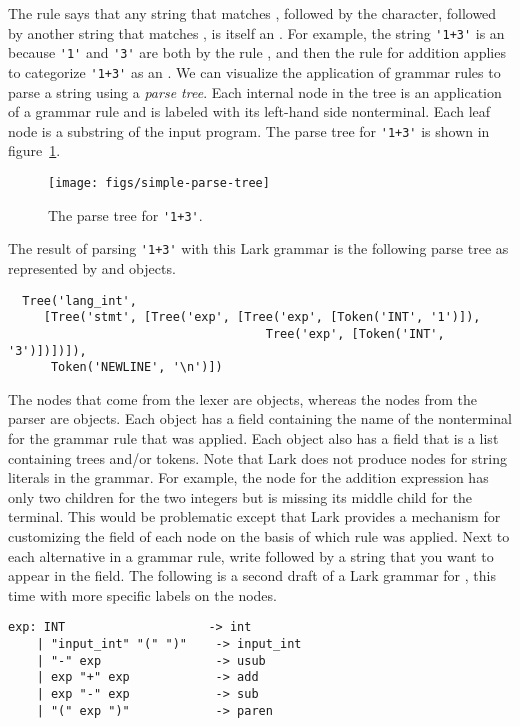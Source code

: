 \documentclass[7x10]{TimesAPriori_MIT}%
\numberwithin{theorem}{chapter}
\numberwithin{definition}{chapter}
\numberwithin{equation}{chapter}
\begin{document}
{The rule  says that any string that matches
, followed by the \code{+} character, followed by another
string that matches , is itself an .  For example,
the string \lstinline{'1+3'} is an  because \lstinline{'1'} and
\lstinline{'3'} are both  by the rule , and then
the rule for addition applies to categorize \lstinline{'1+3'} as an
. We can visualize the application of grammar rules to parse
a string using a \emph{parse tree}. Each
internal node in the tree is an application of a grammar rule and is
labeled with its left-hand side nonterminal. Each leaf node is a
substring of the input program.  The parse tree for \lstinline{'1+3'} is
shown in figure~\ref{fig:simple-parse-tree}.

\begin{figure}[tbp]
\begin{tcolorbox}[colback=white]
\centering
\texttt{[image: figs/simple-parse-tree]}
\end{tcolorbox}
\caption{The parse tree for \lstinline{'1+3'}.}
\label{fig:simple-parse-tree}
\end{figure}

The result of parsing \lstinline{'1+3'} with this Lark grammar is the
following parse tree as represented by  and 
objects.
\begin{lstlisting}
  Tree('lang_int',
     [Tree('stmt', [Tree('exp', [Tree('exp', [Token('INT', '1')]),
                                    Tree('exp', [Token('INT', '3')])])]),
      Token('NEWLINE', '\n')])
\end{lstlisting}
The nodes that come from the lexer are  objects, whereas
the nodes from the parser are  objects.  Each 
object has a  field containing the name of the nonterminal
for the grammar rule that was applied. Each  object also
has a  field that is a list containing trees and/or
tokens. Note that Lark does not produce nodes for string literals in
the grammar. For example, the  node for the addition
expression has only two children for the two integers but is missing
its middle child for the  terminal. This would be
problematic except that Lark provides a mechanism for customizing the
 field of each  node on the basis of which rule was
applied.  Next to each alternative in a grammar rule, write \code{->}
followed by a string that you want to appear in the 
field.  The following is a second draft of a Lark grammar for
\LangInt{}, this time with more specific labels on the 
nodes.
\begin{center}
\begin{minipage}{0.95\textwidth}
\begin{lstlisting}[escapechar=$]
 exp: INT                    -> int
    | "input_int" "(" ")"    -> input_int
    | "-" exp                -> usub
    | exp "+" exp            -> add
    | exp "-" exp            -> sub
    | "(" exp ")"            -> paren


\end{lstlisting}
\end{minipage}
\end{center}}
\end{document}
